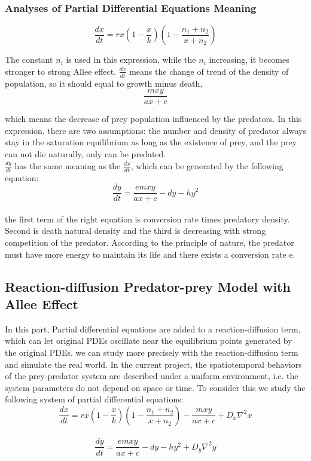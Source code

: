 \documentclass[12pt]{article}
\begin{document}
\subsubsection{Analyses of Partial Differential Equations Meaning}


$$\frac{dx}{dt}=rx(1-\frac{x}{k})(1-\frac{n_1+n_2}{x+n_2})$$

\vspace{12pt}
\noindent The constant $n_i$ is used in this expression, while the $n_i$ increasing, it becomes stronger to strong Allee effect. $\frac{dx}{dt}$ means the change of trend of the density of population, so it should equal to growth minus death, 
\vspace{12pt}
$$\frac{mxy}{ax+c}$$ 

\vspace{12pt}
\noindent which means the decrease of prey population influenced by the predators. In this expression. there are two assumptions: the number and density of predator always stay in the saturation equilibrium as long as the existence of prey, and the prey can not die naturally, only can be predated.
\vspace{12pt}\\
$\frac{dy}{dt}$ has the same meaning as the $\frac{dx}{dt}$, which can be generated by the following equation:\\

$$\frac{dy}{dt}=\frac{emxy}{ax+c}-dy-hy^2$$\\

\noindent the first term of the right equation is conversion rate times predatory density. Second is death natural density and the third is decreasing with strong competition of the predator. According to the principle of nature, the predator must have more energy to maintain its life and there exists a conversion rate e.

\vspace{24pt}

\subsection{Reaction-diffusion Predator-prey Model with Allee Effect}

\noindent In this part, Partial differential equations are added to a reaction-diffusion term, which can let original PDEs oscillate near the equilibrium points generated by the original PDEs. we can study more precisely with the reaction-diffusion term and simulate the real world. In the current project, the spatiotemporal behaviors of the prey-predator system are described under a uniform environment, i.e. the system parameters do not depend on space or time. To consider this we study the following system of partial differential equations: 
\vspace{12pt}
$$\frac{dx}{dt}=rx(1-\frac{x}{k})(1-\frac{n_1+n_2}{x+n_2})-\frac{mxy}{ax+c}+D_x\nabla^2x$$\\
$$\frac{dy}{dt}=\frac{emxy}{ax+c}-dy-hy^2+D_y\nabla^2y$$\\
\end{document}
